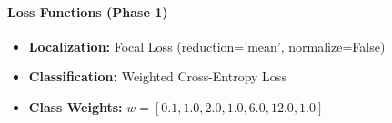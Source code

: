 \paragraph{Loss Functions (Phase 1)}
\begin{itemize}
    \item \textbf{Localization:} Focal Loss (reduction='mean', normalize=False)
    \item \textbf{Classification:} Weighted Cross-Entropy Loss
    \item \textbf{Class Weights:} $w = [0.1, 1.0, 2.0, 1.0, 6.0, 12.0, 1.0]$
\end{itemize}

